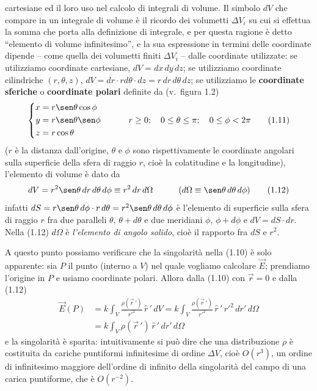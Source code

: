 cartesiane ed il loro uso nel calcolo di integrali di volume. Il simbolo $dV$
che compare in un integrale di volume \`e il ricordo dei volumetti $\Delta V_i$
su cui si effettua la somma che porta alla definizione di integrale, e per
questa ragione \`e detto ``elemento di volume infinitesimo'', e la sua
espressione in termini delle coordinate dipende -- come quella dei volumetti
finiti $\Delta V_i$ -- dalle coordinate utilizzate: se utilizziamo coordinate
cartesiane, $dV=dx\,dy\,dz$; se utilizziamo coordinate cilindriche
$(r,\theta,z)$, $dV=dr\cdot r d\theta\cdot dz=r\,dr\,d\theta\,dz$; se
utilizziamo le \textbf{coordinate sferiche} o \textbf{coordinate polari}
definite da (v.\ figura 1.2)
\begin{equation}
  \left\{\begin{aligned}
    x&=r\sen\theta\cos\phi\\
    y&=r\sen\theta\sen\phi\\
    z&=r\cos\theta
  \end{aligned}\right.
  \qquad\quad r\ge0;\quad 0\le\theta\le\pi;\quad 0\le\phi<2\pi
  \tag{1.11}
\end{equation}
($r$ \`e la distanza dall'origine, $\theta$ e $\phi$ sono rispettivamente le
coordinate angolari sulla superficie della sfera di raggio $r$, cio\`e la
colatitudine e la longitudine), l'elemento di volume \`e dato da
\begin{equation}
  dV=r^2\sen\theta\,dr\,d\theta\,d\phi\equiv r^2\,dr\,d\Omega
  \qquad\quad(d\Omega\equiv\sen\theta\,d\theta\,d\phi)
  \tag{1.12}
\end{equation}
infatti $dS=r\sen\theta\,d\phi\cdot r\,d\theta=r^2\sen\theta\,d\theta\,d\phi$
\`e l'elemento di superficie sulla sfera di raggio $r$ fra due paralleli
$\theta$, $\theta+d\theta$ e due meridiani $\phi$, $\phi+d\phi$ e
$dV=dS\cdot dr$. Nella (1.12) $d\Omega$ \`e \emph{l'elemento di angolo solido},
cio\`e il rapporto fra $dS$ e $r^2$.

A questo punto possiamo verificare che la singolarit\`a nella (1.10) \`e solo
apparente: sia $P$ il punto (interno a $V$) nel quale vogliamo calcolare
$\vec E$; prendiamo l'origine in $P$ e usiamo coordinate polari. Allora dalla
(1.10) con $\vec r=0$ e dalla (1.12)
\begin{equation}
  \begin{split}
    \vec E(P)&=k\int_V\frac{\rho(\vec r\,')}{r'^2}\,\hat r\,'\,dV
    =k\int_V\frac{\rho(\vec r\,')}{r'^2}\,\hat r\,'\,r'^2\,dr'\,d\Omega\\
    &=k\int_V\rho(\vec r\,')\,\hat r\,'\,dr'\,d\Omega
  \end{split}
  \tag{1.13}
\end{equation}
e la singolarit\`a \`e sparita: intuitivamente si pu\`o dire che una
distribuzione $\rho$ \`e costituita da cariche puntiformi infinitesime di ordine
$\Delta V$, cio\`e $O(r^3)$, un ordine di infinitesimo maggiore dell'ordine di
infinito della singolarit\`a del campo di una carica puntiforme, che \`e
$O(r^{-2})$.

